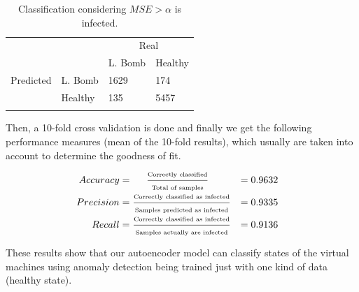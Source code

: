 \documentclass{iosart2c}
\begin{document}
\begin{table}[h!]
\centering
\begin{tabular}{llll}
                                                &                                 & \multicolumn{2}{c}{Real}                                       \\ \cline{3-4} 
                                                & \multicolumn{1}{l|}{}           & \multicolumn{1}{l|}{L. Bomb} & \multicolumn{1}{l|}{Healthy} \\ \cline{2-4} 
\multicolumn{1}{c|}{Predicted} & \multicolumn{1}{l|}{L. Bomb} & \multicolumn{1}{l|}{1629}       & \multicolumn{1}{l|}{174}     \\ \cline{2-4} 
\multicolumn{1}{c|}{}                           & \multicolumn{1}{l|}{Healthy}    & \multicolumn{1}{l|}{135}        & \multicolumn{1}{l|}{5457}    \\ \cline{2-4} 
\vspace{0.001cm}
\end{tabular}
\caption{Classification considering  $MSE>\alpha$ is infected.}
\label{confusion_matrix}
\end{table}

Then, a 10-fold cross validation is done and finally we get the following performance measures (mean of the 10-fold results), which usually are taken into account to determine the goodness of fit.

\begin{equation*}
\begin{aligned}
\hspace{-0.3cm} Accuracy  &= \hspace{0.5cm} \frac{\text{\tiny{Correctly classified}}}{\text{\tiny{Total of samples}}}           &= 0.9632 \\
\hspace{-0.3cm} Precision &=\frac{\text{\tiny{Correctly classified as infected}}}{\text{\tiny{Samples predicted as infected}}} &= 0.9335\\
\hspace{-0.3cm} Recall    &=\frac{\text{\tiny{Correctly classified as infected}}}{\text{\tiny{Samples actually are infected}}} &= 0.9136\\
\end{aligned}
\end{equation*}

These results show that our autoencoder model can classify states of the virtual machines using anomaly detection being trained just with one kind of data (healthy state).
\end{document}
